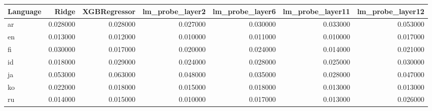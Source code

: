 \begin{tabular}{lrrrrrr}
\toprule
Language & Ridge & XGBRegressor & lm_probe_layer2 & lm_probe_layer6 & lm_probe_layer11 & lm_probe_layer12 \\
\midrule
ar & 0.028000 & 0.028000 & 0.027000 & 0.030000 & 0.033000 & 0.053000 \\
en & 0.013000 & 0.012000 & 0.010000 & 0.011000 & 0.010000 & 0.017000 \\
fi & 0.030000 & 0.017000 & 0.020000 & 0.024000 & 0.014000 & 0.021000 \\
id & 0.018000 & 0.029000 & 0.024000 & 0.028000 & 0.025000 & 0.030000 \\
ja & 0.053000 & 0.063000 & 0.048000 & 0.035000 & 0.028000 & 0.047000 \\
ko & 0.022000 & 0.018000 & 0.015000 & 0.018000 & 0.013000 & 0.013000 \\
ru & 0.014000 & 0.015000 & 0.010000 & 0.017000 & 0.013000 & 0.026000 \\
\bottomrule
\end{tabular}

